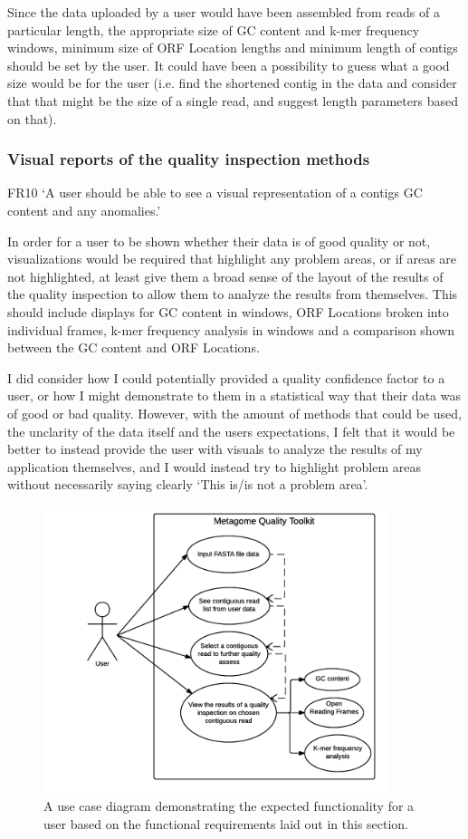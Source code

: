 Since the data uploaded by a user would have been assembled from reads of a particular length, the appropriate size of GC content and k-mer frequency windows, minimum size of ORF Location lengths and minimum length of contigs should be set by the user. It could have been a possibility to guess what a good size would be for the user (i.e. find the shortened contig in the data and consider that that might be the size of a single read, and suggest length parameters based on that).

\subsubsection{Visual reports of the quality inspection methods}
FR10 `A user should be able to see a visual representation of a contigs GC content and any anomalies.'

In order for a user to be shown whether their data is of good quality or not, visualizations would be required that highlight any problem areas, or if areas are not highlighted, at least give them a broad sense of the layout of the results of the quality inspection to allow them to analyze the results from themselves. This should include displays for GC content in windows, ORF Locations broken into individual frames, k-mer frequency analysis in windows and a comparison shown between the GC content and ORF Locations.

I did consider how I could potentially provided a quality confidence factor to a user, or how I might demonstrate to them in a statistical way that their data was of good or bad quality. However, with the amount of methods that could be used, the unclarity of the data itself and the users expectations, I felt that it would be better to instead provide the user with visuals to analyze the results of my application themselves, and I would instead try to highlight problem areas without necessarily saying clearly `This is/is not a problem area'.

\begin{figure}[H]
 \centering
\includegraphics[width=0.9\textwidth]{images/usecase}
\caption{A use case diagram demonstrating the expected functionality for a user based on the functional requirements laid out in this section.}
\end{figure}

